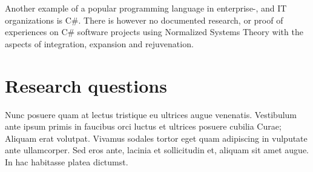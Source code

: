 Another example of a popular programming language in enterprise-, and IT organizations is
C\#. There is however no documented research, or proof of experiences on C\# software
projects using Normalized Systems Theory with the aspects of integration, expansion and
rejuvenation.





\section{Research questions} \label{ResearchQuestions}

Nunc posuere quam at lectus tristique eu ultrices augue venenatis. Vestibulum ante ipsum
primis in faucibus orci luctus et ultrices posuere cubilia Curae; Aliquam erat volutpat.
Vivamus sodales tortor eget quam adipiscing in vulputate ante ullamcorper. Sed eros ante,
lacinia et sollicitudin et, aliquam sit amet augue. In hac habitasse platea dictumst.